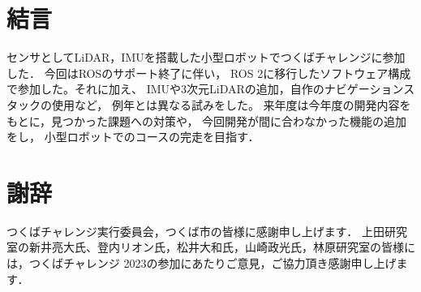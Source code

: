 \documentclass[twocolumn,9pt]{jsproceedings}
\begin{document}
\section{結言}
センサとしてLiDAR，IMUを搭載した小型ロボットでつくばチャレンジに参加した．
今回はROSのサポート終了に伴い，
ROS 2に移行したソフトウェア構成で参加した。それに加え、
IMUや3次元LiDARの追加，自作のナビゲーションスタックの使用など，
例年とは異なる試みをした。
来年度は今年度の開発内容をもとに，見つかった課題への対策や，
今回開発が間に合わなかった機能の追加をし，
小型ロボットでのコースの完走を目指す．


\section*{謝辞}
つくばチャレンジ実行委員会，つくば市の皆様に感謝申し上げます．
上田研究室の新井亮大氏、登内リオン氏，松井大和氏，山崎政光氏，林原研究室の皆様には，つくばチャレンジ 2023の参加にあたりご意見，ご協力頂き感謝申し上げます．
\end{document}
